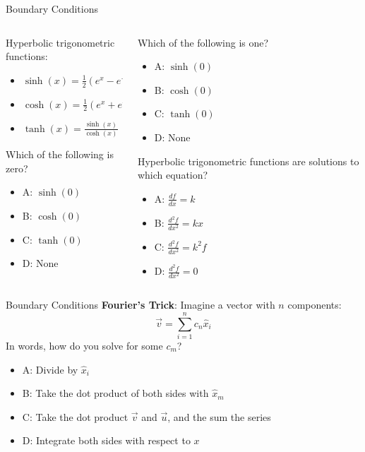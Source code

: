 \documentclass{beamer}
\begin{document}
\begin{frame}{Boundary Conditions}
\begin{columns}[T]
\begin{column}{0.5\textwidth}
Hyperbolic trigonometric functions:
\begin{itemize}
\item $\sinh(x) = \frac{1}{2}\left( e^{x} - e^{-x} \right)$
\item $\cosh(x) = \frac{1}{2}\left( e^{x} + e^{-x} \right)$
\item $\tanh(x) = \frac{\sinh(x)}{\cosh(x)}$
\end{itemize} \vspace{0.5cm}
Which of the following is zero?
\begin{itemize}
\item A: $\sinh(0)$
\item B: $\cosh(0)$
\item C: $\tanh(0)$
\item D: None
\end{itemize}
\end{column}
\begin{column}{0.5\textwidth}
Which of the following is one?
\begin{itemize}
\item A: $\sinh(0)$
\item B: $\cosh(0)$
\item C: $\tanh(0)$
\item D: None
\end{itemize}
Hyperbolic trigonometric functions are solutions to which equation?
\begin{itemize}
\item A: $\frac{df}{dx} = k$
\item B: $\frac{d^2f}{dx^2} = kx$
\item C: $\frac{d^2f}{dx^2} = k^2f$
\item D: $\frac{d^2f}{dx^2} = 0$
\end{itemize}
\end{column}
\end{columns}
\end{frame}

\begin{frame}{Boundary Conditions}
\alert{\textbf{Fourier's Trick}}: Imagine a vector with $n$ components:
\begin{equation}
\vec{v} = \sum_{i = 1}^n c_n \hat{x}_i
\end{equation}
In words, how do you solve for some $c_m$?
\begin{itemize}
\item A: Divide by $\hat{x}_i$
\item B: Take the dot product of both sides with $\hat{x}_{m}$
\item C: Take the dot product $\vec{v}$ and $\vec{u}$, and the sum the series
\item D: Integrate both sides with respect to $x$
\end{itemize}
\end{frame}
\end{document}
